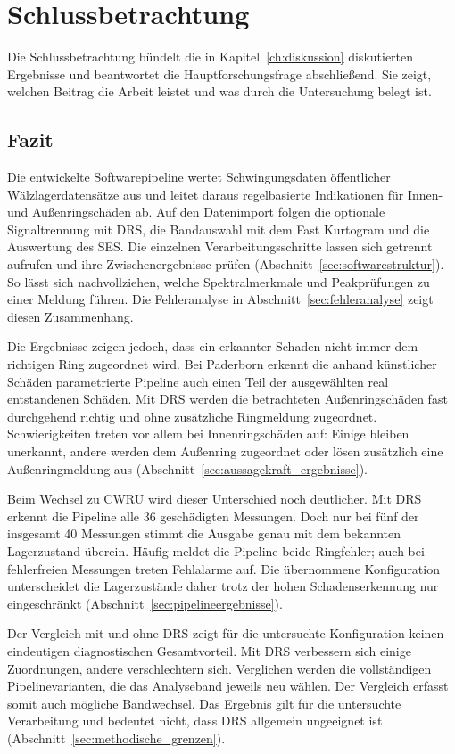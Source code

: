 \chapter{Schlussbetrachtung}
\label{ch:schlussbetrachtung}

Die Schlussbetrachtung bündelt die in Kapitel~\ref{ch:diskussion}
diskutierten Ergebnisse und beantwortet die Hauptforschungsfrage
abschließend. Sie zeigt, welchen Beitrag die Arbeit leistet und
was durch die Untersuchung belegt ist.

\section{Fazit}
\label{sec:fazit}

Die entwickelte Softwarepipeline wertet Schwingungsdaten öffentlicher
Wälzlagerdatensätze aus und leitet daraus regelbasierte Indikationen
für Innen- und Außenringschäden ab. Auf den Datenimport folgen die
optionale Signaltrennung mit DRS, die Bandauswahl mit dem Fast Kurtogram
und die Auswertung des SES. Die einzelnen Verarbeitungsschritte lassen
sich getrennt aufrufen und ihre Zwischenergebnisse prüfen
(Abschnitt~\ref{sec:softwarestruktur}). So lässt sich nachvollziehen,
welche Spektralmerkmale und Peakprüfungen zu einer Meldung führen.
Die Fehleranalyse in Abschnitt~\ref{sec:fehleranalyse} zeigt diesen
Zusammenhang.

Die Ergebnisse zeigen jedoch, dass ein erkannter Schaden nicht immer
dem richtigen Ring zugeordnet wird. Bei Paderborn erkennt die anhand
künstlicher Schäden parametrierte Pipeline auch einen Teil der ausgewählten
real entstandenen Schäden. Mit DRS werden die betrachteten Außenringschäden
fast durchgehend richtig und ohne zusätzliche Ringmeldung zugeordnet.
Schwierigkeiten treten vor allem bei Innenringschäden auf: Einige bleiben
unerkannt, andere werden dem Außenring zugeordnet oder lösen zusätzlich
eine Außenringmeldung aus
(Abschnitt~\ref{sec:aussagekraft_ergebnisse}).

Beim Wechsel zu CWRU wird dieser Unterschied noch deutlicher. Mit DRS
erkennt die Pipeline alle 36 geschädigten Messungen. Doch nur bei fünf
der insgesamt 40 Messungen stimmt die Ausgabe genau mit dem bekannten
Lagerzustand überein. Häufig meldet die Pipeline beide Ringfehler;
auch bei fehlerfreien Messungen treten Fehlalarme auf. Die übernommene
Konfiguration unterscheidet die Lagerzustände daher trotz der hohen
Schadenserkennung nur eingeschränkt
(Abschnitt~\ref{sec:pipelineergebnisse}).

Der Vergleich mit und ohne DRS zeigt für die untersuchte Konfiguration
keinen eindeutigen diagnostischen Gesamtvorteil. Mit DRS verbessern sich
einige Zuordnungen, andere verschlechtern sich. Verglichen werden die
vollständigen Pipelinevarianten, die das Analyseband jeweils neu wählen.
Der Vergleich erfasst somit auch mögliche Bandwechsel. Das Ergebnis
gilt für die untersuchte Verarbeitung und bedeutet nicht, dass DRS
allgemein ungeeignet ist
(Abschnitt~\ref{sec:methodische_grenzen}).

